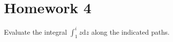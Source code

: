\documentclass[10pt]{article}
\newcommand{\dd}{\mathrm{d}}
\begin{document}

\section*{Homework 4}

\begin{Problem}
	
	Evaluate the integral $\int_1^i z \dd z$ along the indicated paths.

\end{Problem}
\end{document}
